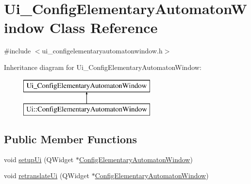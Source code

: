 \hypertarget{class_ui___config_elementary_automaton_window}{}\section{Ui\+\_\+\+Config\+Elementary\+Automaton\+Window Class Reference}
\label{class_ui___config_elementary_automaton_window}


{\ttfamily \#include $<$ui\+\_\+configelementaryautomatonwindow.\+h$>$}

Inheritance diagram for Ui\+\_\+\+Config\+Elementary\+Automaton\+Window\+:\begin{figure}[H]
\begin{center}
\leavevmode
\includegraphics[height=2.000000cm]{class_ui___config_elementary_automaton_window}
\end{center}
\end{figure}
\subsection*{Public Member Functions}
\begin{DoxyCompactItemize}
\item 
void \mbox{\hyperlink{class_ui___config_elementary_automaton_window_ad1c9293e0ded491439b4f7bedae4258c}{setup\+Ui}} (Q\+Widget $\ast$\mbox{\hyperlink{class_config_elementary_automaton_window}{Config\+Elementary\+Automaton\+Window}})
\item 
void \mbox{\hyperlink{class_ui___config_elementary_automaton_window_af25feef5d9603ef556e055cffb7606ea}{retranslate\+Ui}} (Q\+Widget $\ast$\mbox{\hyperlink{class_config_elementary_automaton_window}{Config\+Elementary\+Automaton\+Window}})
\end{DoxyCompactItemize}
